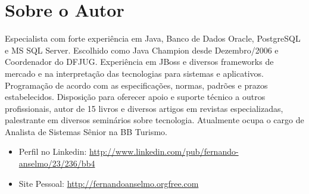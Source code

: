 \documentclass[a4paper,11pt]{book} %
\begin{document}
\section{Sobre o Autor}
Especialista com forte experiência em Java, Banco de Dados Oracle, PostgreSQL e MS SQL Server. Escolhido como Java Champion desde Dezembro/2006 e Coordenador do DFJUG. Experiência em JBoss e diversos frameworks de mercado e na interpretação das tecnologias para sistemas e aplicativos. Programação de acordo com as especificações, normas, padrões e prazos estabelecidos. Disposição para oferecer apoio e suporte técnico a outros profissionais, autor de 15 livros e diversos artigos em revistas especializadas, palestrante em diversos seminários sobre tecnologia. Atualmente ocupa o cargo de Analista de Sistemas Sênior na BB Turismo.
\begin{itemize}
 \item Perfil no Linkedin: \url{http://www.linkedin.com/pub/fernando-anselmo/23/236/bb4}
 \item Site Pessoal: \url{http://fernandoanselmo.orgfree.com} 
\end{itemize}

\clearpage
\begingroup
\thispagestyle{empty}
\vfill
\endgroup


\end{document}
